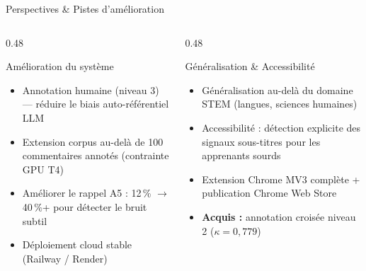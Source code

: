 \documentclass[aspectratio=169, 12pt]{beamer}
\newcommand{\cmark}{\textcolor{accentgreen}{\ding{51}}}
\begin{document}
\begin{frame}{Perspectives \& Pistes d'amélioration}

  \begin{columns}[T]
    \begin{column}{0.48\textwidth}
      \begin{block}{Amélioration du système}
        \begin{itemize}\setlength{\itemsep}{3pt}
          \item Annotation humaine (niveau 3) — réduire le biais
                auto-référentiel LLM
          \item Extension corpus au-delà de 100 commentaires annotés
                (contrainte GPU T4)
          \item Améliorer le rappel A5 : 12\,\% $\to$ 40\,\%+
                pour détecter le bruit subtil
          \item Déploiement cloud stable (Railway / Render)
        \end{itemize}
      \end{block}
    \end{column}
    \begin{column}{0.48\textwidth}
      \begin{exampleblock}{Généralisation \& Accessibilité}
        \begin{itemize}\setlength{\itemsep}{3pt}
          \item Généralisation au-delà du domaine STEM
                (langues, sciences humaines)
          \item Accessibilité : détection explicite des signaux
                sous-titres pour les apprenants sourds
          \item Extension Chrome MV3 complète
                + publication Chrome Web Store
          \item \textcolor{accentgreen}{\textbf{Acquis :}} annotation
                croisée niveau 2 ($\kappa=0{,}779$) \cmark
        \end{itemize}
      \end{exampleblock}
    \end{column}
  \end{columns}

\end{frame}

\end{document}
